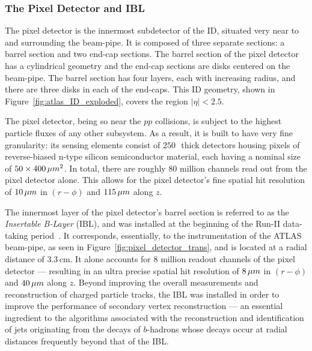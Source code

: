 \subsubsection{The Pixel Detector and IBL}
\label{sec:id_pixel}

The pixel detector is the innermost subdetector of the ID, situated very near to and surrounding
the beam-pipe.
It is composed of three separate sections: a barrel section and two end-cap sections.
The barrel section  of the pixel detector has a cylindrical geometry and the end-cap sections
are disks centered on the beam-pipe.
The barrel section has four layers, each with increasing radius, and there are three disks in each
of the end-caps. This ID geometry, shown in Figure~\ref{fig:atlas_ID_exploded}, covers
the region $\lvert \eta \rvert < 2.5$.

The pixel detector, being so near the $pp$ collisions, is subject to the highest particle
fluxes of any other subsystem.
As a result, it is built to have very fine granularity: its sensing elements consist of
$250$\,\micron~thick detectors housing pixels of reverse-biased n-type silicon semiconductor material,
each having a nominal size of $50\times400\,\mu m^2$.
In total, there are roughly 80 million channels read out from the pixel detector alone.
This allows for the pixel detector's fine spatial hit resolution of $10\,\mu m$ in
$(r-\phi)$ and $115\,\mu m$ along $z$.

The innermost layer of the pixel detector's barrel section is referred to as the
\textit{Insertable B-Layer} (IBL), and was installed at the beginning of the Run-II
data-taking period~\cite{Capeans:1291633}.
It corresponds, essentially, to the instrumentation of the ATLAS beam-pipe, as seen in Figure~\ref{fig:pixel_detector_trans},
and is located at a radial distance of 3.3\,cm.
It alone accounts for 8 million readout channels of
the pixel detector --- resulting in an ultra precise spatial hit resolution of $8\,\mu m$ in $(r-\phi)$ and
$40\,\mu m$ along $z$.
Beyond improving the overall measurements and reconstruction of charged particle tracks,
the IBL was installed in order to improve the performance of secondary vertex
reconstruction --- an essential ingredient to the algorithms associated with
the reconstruction and identification of jets originating from the decays
of $b$-hadrons whose decays occur at radial distances frequently beyond that
of the IBL.

